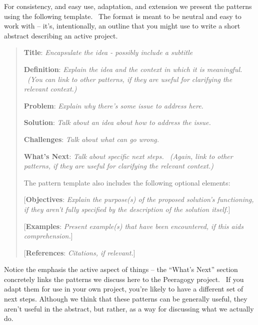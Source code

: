 For consistency, and easy use, adaptation, and extension we present
the patterns using the following template.~ The format is meant to be
neutral and easy to work with -- it's, intentionally, an outline that
you might use to write a short abstract describing an active project.

\begin{quote}
\textbf{Title}: \emph{Encapsulate the idea - possibly include a
subtitle}

\textbf{Definition}: \emph{Explain the idea and the context in which it
is meaningful. ~(You can link to other patterns, if they are useful for
clarifying the relevant context.)}

\textbf{Problem}: \emph{Explain why there's some issue to address here.}

\textbf{Solution}: \emph{Talk about an idea about how to address the
issue.}

\textbf{Challenges}: \emph{Talk about what can go wrong.}

\textbf{What's Next}: \emph{Talk about specific next steps. ~(Again,
link to other patterns, if they are useful for clarifying the relevant
context.)}

The pattern template also includes the following optional elements:

{[}\textbf{Objectives}: \emph{Explain the purpose(s) of the proposed
solution's functioning, if they aren't fully specified by the
description of the solution itself.}{]}

{[}\textbf{Examples}: \emph{Present example(s) that have been
encountered, if this aids comprehension.}{]}

{[}\textbf{References}: \emph{Citations, if relevant.}{]}
\end{quote}

Notice the emphasis the active aspect of things -- the ``What's Next''
section concretely links the patterns we discuss here to the Peeragogy
project.~ If you adapt them for use in your own project, you're likely
to have a different set of next steps. Although we think that these
patterns can be generally useful, they aren't useful in the abstract,
but rather, as a way for discussing what we actually do.

